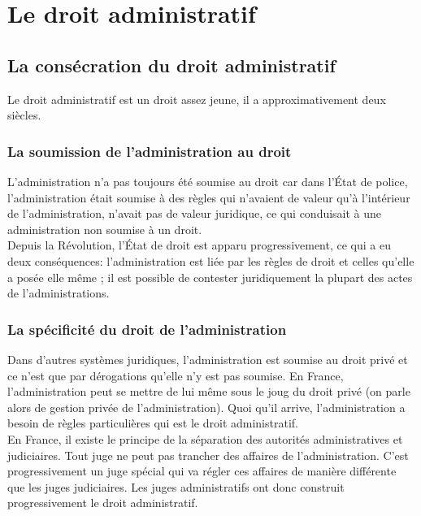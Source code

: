 \documentclass[10pt, a4paper, openany]{book}
\begin{document}
\section{Le droit administratif}

\subsection{La consécration du droit administratif}

Le droit administratif est un droit assez jeune, il a approximativement deux siècles.

\subsubsection{La soumission de l'administration au droit}

L'administration n'a pas toujours été soumise au droit car dans l'État de police, l'administration était soumise à des règles qui n'avaient de valeur qu'à l'intérieur de l'administration, n'avait pas de valeur juridique, ce qui conduisait à une administration non soumise à un droit. \\
Depuis la Révolution, l'État de droit est apparu progressivement, ce qui a eu deux conséquences: l'administration est liée par les règles de droit et celles qu'elle a posée elle même ; il est possible de contester juridiquement la plupart des actes de l'administrations. \\

\subsubsection{La spécificité du droit de l'administration}

Dans d'autres systèmes juridiques, l'administration est soumise au droit privé et ce n'est que par dérogations qu'elle n'y est pas soumise. En France, l'administration peut se mettre de lui même sous le joug du droit privé (on parle alors de gestion privée de l'administration). Quoi qu'il arrive, l'administration a besoin de règles particulières qui est le droit administratif. \\
En France, il existe le principe de la séparation des autorités administratives et judiciaires. Tout juge ne peut pas trancher des affaires de l'administration. C'est progressivement un juge spécial qui va régler ces affaires de manière différente que les juges judiciaires. Les juges administratifs ont donc construit progressivement le droit administratif.
\end{document}
